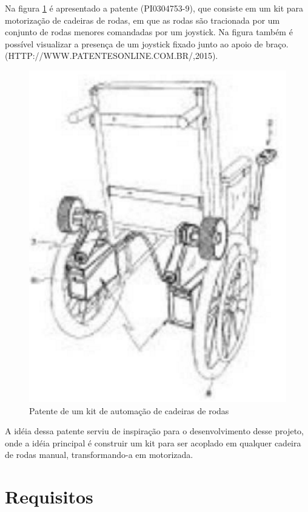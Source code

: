 Na figura \ref{fig:kit_motorizacao} é apresentado a patente (PI0304753-9), que consiste em um kit para motorização de cadeiras de rodas, em que as rodas são tracionada por um conjunto de rodas menores comandadas por um joystick. Na figura também é possível visualizar a presença de um joystick fixado junto ao apoio de braço. (HTTP://WWW.PATENTESONLINE.COM.BR/,2015).

\begin{figure}[!htb]
  \centering
  \includegraphics[keepaspectratio=true,scale=0.50]{figuras/introducao/kit_motorizacao}
  \caption{Patente de um kit de automação de cadeiras de rodas}
  \label{fig:kit_motorizacao}
\end{figure}

A idéia dessa patente serviu de inspiração para o desenvolvimento desse projeto, onde a idéia principal é construir um kit para ser acoplado em qualquer cadeira de rodas manual, transformando-a em motorizada.

\section{Requisitos}

